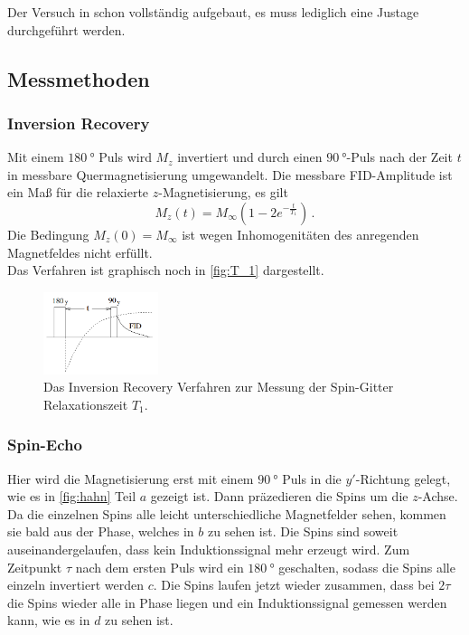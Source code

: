         \noindent Der Versuch in schon vollständig aufgebaut, es muss lediglich eine Justage durchgeführt werden. 

    \subsection{Messmethoden}
    \label{sec:Messmethoden}

    \subsubsection{Inversion Recovery}

        Mit einem $\SI{180}{\degree}$ Puls wird $M_z$ invertiert und durch einen $\SI{90}{\degree}$-Puls nach der Zeit $t$ 
        in messbare Quermagnetisierung umgewandelt. Die messbare FID-Amplitude ist ein Maß für die relaxierte $z$-Magnetisierung, es gilt 
        \begin{equation*}
            M_z(t) = M_\infty \left(1 - 2e^{-\frac{t}{T_1}}\right)\, .
        \end{equation*}
        Die Bedingung $M_z(0) = M_\infty$ ist wegen Inhomogenitäten des anregenden Magnetfeldes nicht erfüllt. \\
        Das Verfahren ist graphisch noch in \autoref{fig:T_1} dargestellt. 

        \begin{figure}%
            \centering%
            \includegraphics[width=0.3\textwidth]{latex/images/t_1_messung.png}%
            \caption{Das Inversion Recovery Verfahren zur Messung der Spin-Gitter Relaxationszeit $T_1$. \cite{grundlagen}}%
            \label{fig:T_1}%
        \end{figure}%

    \subsubsection{Spin-Echo}

        \noindent Hier wird die Magnetisierung erst mit einem $\SI{90}{\degree}$ Puls in die $y'$-Richtung gelegt, wie es in \autoref{fig:hahn} Teil \(a\) gezeigt ist. Dann präzedieren die Spins 
        um die $z$-Achse. Da die einzelnen Spins alle leicht unterschiedliche Magnetfelder sehen, kommen sie bald aus der Phase, welches in \(b\) zu sehen ist. Die Spins sind soweit auseinandergelaufen, 
        dass kein Induktionssignal mehr erzeugt wird. Zum Zeitpunkt $\tau$ nach dem ersten Puls wird ein $\SI{180}{\degree}$ geschalten, sodass die Spins alle einzeln invertiert werden \(c\). 
        Die Spins laufen jetzt wieder zusammen, dass bei $2 \tau$ die Spins wieder alle in Phase liegen und ein Induktionssignal gemessen werden kann, wie es in \(d\) zu sehen ist.  


